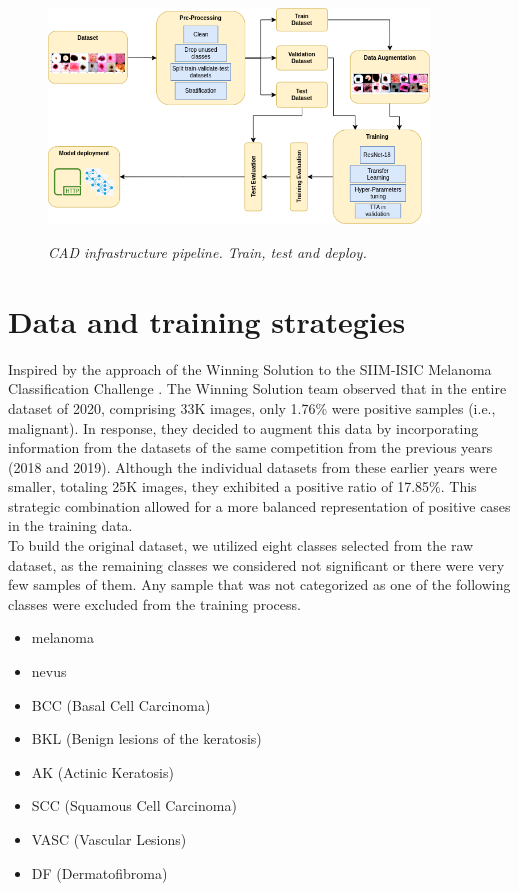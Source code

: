 \begin{figure}[H]
  \centering
  \includegraphics[width=0.9\textwidth]{imatges/methodological_contribution/Pipeline.drawio.png}
  \caption{\textit{CAD infrastructure pipeline. Train, test and deploy. }}
  {\label{fig:cad-pipeline}}
\end{figure}

\section{Data and training strategies}

Inspired by the approach of the Winning Solution to the SIIM-ISIC Melanoma
Classification Challenge \cite{WinningISIC}. The Winning Solution team observed
that in the entire dataset of 2020, comprising 33K images, only 1.76\% were
positive samples (i.e., malignant). In response, they decided to augment this
data by incorporating information from the datasets of the same competition
from the previous years (2018 and 2019). Although the individual datasets from
these earlier years were smaller, totaling 25K images, they exhibited a
positive ratio of 17.85\%. This strategic combination allowed for a more
balanced representation of positive cases in the training data. \\

To build the original dataset, we utilized eight classes selected from the raw
dataset, as the remaining classes we considered not significant or there were
very few samples of them. Any sample that was not categorized as one of the
following classes were excluded from the training process.

\begin{itemize}
  \item melanoma
  \item nevus
  \item BCC (Basal Cell Carcinoma)
  \item BKL (Benign lesions of the keratosis)
  \item AK (Actinic Keratosis)
  \item SCC (Squamous Cell Carcinoma)
  \item VASC (Vascular Lesions)
  \item DF (Dermatofibroma)
\end{itemize}

